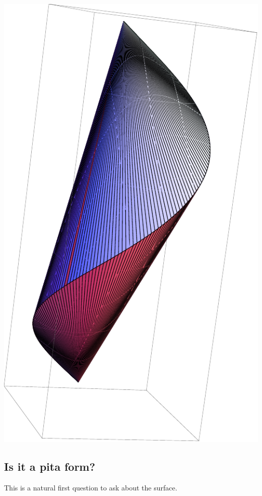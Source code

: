 \documentclass[12pt]{article}
\begin{document}
\begin{center}
\includegraphics[scale=.6]{pita_h=5_n=150.pdf}
\end{center}

\subsection{Is it a pita form?}
This is a natural first question to ask about the surface. 
\end{document}
